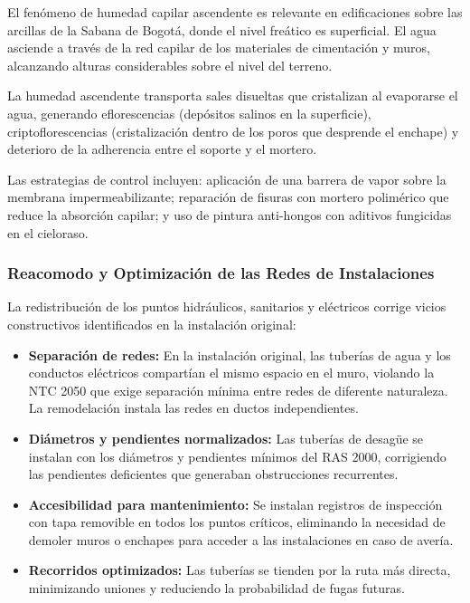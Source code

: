 ﻿\documentclass[12pt]{article}
\begin{document}
El fenómeno de humedad capilar ascendente es relevante en edificaciones sobre las
arcillas de la Sabana de Bogotá, donde el nivel freático es superficial. El agua
asciende a través de la red capilar de los materiales de cimentación y muros,
alcanzando alturas considerables sobre el nivel del terreno.

La humedad ascendente transporta sales disueltas que cristalizan al evaporarse el
agua, generando eflorescencias (depósitos salinos en la superficie), criptoflorescencias
(cristalización dentro de los poros que desprende el enchape) y deterioro de la
adherencia entre el soporte y el mortero.

Las estrategias de control incluyen: aplicación de una barrera de vapor sobre la
membrana impermeabilizante; reparación de fisuras con mortero polimérico que reduce
la absorción capilar; y uso de pintura anti-hongos con aditivos fungicidas en el
cieloraso.

\subsubsection{Reacomodo y Optimización de las Redes de Instalaciones}

La redistribución de los puntos hidráulicos, sanitarios y eléctricos corrige vicios
constructivos identificados en la instalación original:

\begin{itemize}[noitemsep]
  \item {\bfseries Separación de redes:} En la instalación original, las tuberías de
  agua y los conductos eléctricos compartían el mismo espacio en el muro, violando
  la NTC 2050 que exige separación mínima entre redes de diferente naturaleza. La
  remodelación instala las redes en ductos independientes.
  \item {\bfseries Diámetros y pendientes normalizados:} Las tuberías de desagüe se
  instalan con los diámetros y pendientes mínimos del RAS 2000, corrigiendo las
  pendientes deficientes que generaban obstrucciones recurrentes.
  \item {\bfseries Accesibilidad para mantenimiento:} Se instalan registros de
  inspección con tapa removible en todos los puntos críticos, eliminando la necesidad
  de demoler muros o enchapes para acceder a las instalaciones en caso de avería.
  \item {\bfseries Recorridos optimizados:} Las tuberías se tienden por la ruta más
  directa, minimizando uniones y reduciendo la probabilidad de fugas futuras.
\end{itemize}
\end{document}
